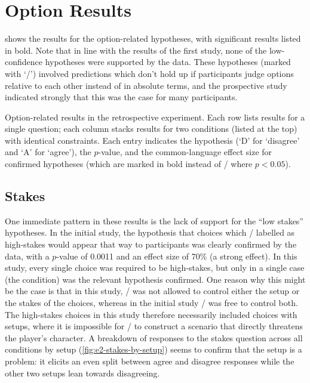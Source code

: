 \section{Option Results}

 shows the results for the option-related hypotheses, with significant results listed in bold.
%
Note that in line with the results of the first study, none of the low-confidence hypotheses were supported by the data.
%
These hypotheses (marked with `\lc/') involved predictions which don't hold up if participants judge options relative to each other instead of in absolute terms, and the prospective study indicated strongly that this was the case for many participants.

\begin{table}[!t]
\centering
\bgroup
\def\arraystretch{1.3}
\setlength{\tabcolsep}{0.35em}

\egroup
\caption[Retrospective option results]{Option-related results in the retrospective experiment. Each row lists results for a single question; each column stacks results for two conditions (listed at the top) with identical  constraints. Each entry indicates the hypothesis (`D' for `disagree' and `A' for `agree'), the $p$-value, and the common-language effect size for confirmed hypotheses (which are marked in bold instead of \nsighcolor/ where $p < 0.05$).} %
  \label{tab:e2-option-results}
\end{table}


\subsection{Stakes}
One immediate pattern in these results is the lack of support for the ``low stakes'' hypotheses.
%
In the initial study, the hypothesis that choices which \dunyazad/ labelled as high-stakes would appear that way to participants was clearly confirmed by the data, with a $p$-value of 0.0011 and an effect size of 70\% (a strong effect).
%
In this study, every single choice was required to be high-stakes, but only in a single case (the \unxs{} condition) was the relevant hypothesis confirmed.
%
One reason why this might be the case is that in this study, \dunyazad/ was not allowed to control either the setup or the stakes of the choices, whereas in the initial study \dunyazad/ was free to control both.
%
The high-stakes choices in this study therefore necessarily included choices with  setups, where it is impossible for \dunyazad/ to construct a scenario that directly threatens the player's character.
%
A breakdown of responses to the stakes question across all conditions by setup (\cref{fig:e2-stakes-by-setup}) seems to confirm that the  setup is a problem: it elicits an even split between agree and disagree responses while the other two setups lean towards disagreeing.

